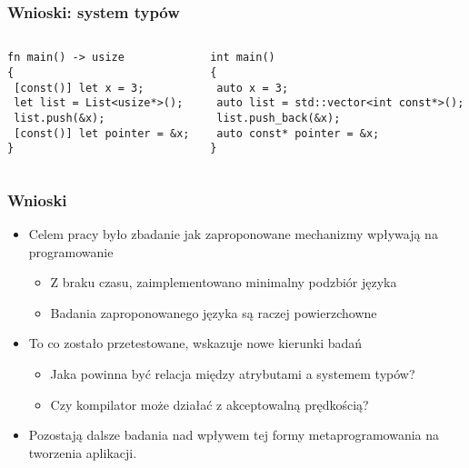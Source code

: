 \begin{frame}[fragile]
	\frametitle{Wnioski: system typów}

	\begin{columns}
		\begin{column}{0.5\textwidth}
			\begin{lstlisting}[caption={const w C-=-1}]
fn main() -> usize
{
 [const()] let x = 3;
 let list = List<usize*>();
 list.push(&x);
 [const()] let pointer = &x;
}
			\end{lstlisting}
		\end{column}
		\begin{column}{0.5\textwidth}
			\begin{lstlisting}[caption={const w C++}]
int main()
{
 auto x = 3;
 auto list = std::vector<int const*>();
 list.push_back(&x);
 auto const* pointer = &x;
}

			\end{lstlisting}
		\end{column}
	\end{columns}
\end{frame}



\begin{frame}
	\frametitle{Wnioski}

	\begin{itemize}
		\item Celem pracy było zbadanie jak zaproponowane mechanizmy wpływają na programowanie\begin{itemize}%
			\item Z braku czasu, zaimplementowano minimalny podzbiór języka
			\item Badania zaproponowanego języka są raczej powierzchowne
		\end{itemize}
		\item To co zostało przetestowane, wskazuje nowe kierunki badań\begin{itemize}
			\item Jaka powinna być relacja między atrybutami a systemem typów?
			\item Czy kompilator może działać z akceptowalną prędkością?
		\end{itemize}
		\item Pozostają dalsze badania nad wpływem tej formy metaprogramowania na tworzenia aplikacji.
	\end{itemize}

\end{frame}
